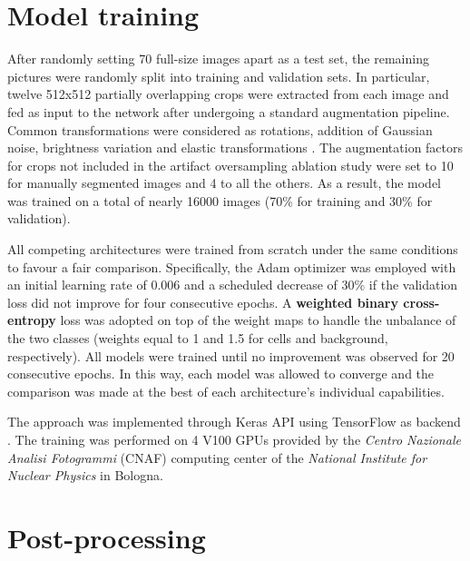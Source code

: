 
\section{Model training}
\label{sec:model_training}
After randomly setting 70 full-size images apart as a test set, the remaining pictures were randomly split into training and validation sets. 
In particular, twelve 512x512 partially overlapping crops were extracted from each image and fed as input to the network after undergoing a standard augmentation pipeline. Common transformations were considered as rotations, addition of Gaussian noise, brightness variation and elastic transformations \cite{elastic_tranformation}. 
The augmentation factors for crops not included in the artifact oversampling ablation study were set to 10 for manually segmented images and 4 to all the others.
As a result, the model was trained on a total of nearly 16000 images (70\% for training and 30\% for validation).

All competing architectures were trained from scratch under the same conditions to favour a fair comparison.
Specifically, the Adam \cite{adam} optimizer was employed with an initial learning rate of 0.006 and a scheduled decrease of 30\% if the validation loss did not improve for four consecutive epochs. 
A \textbf{weighted binary cross-entropy} loss was adopted on top of the weight maps to handle the unbalance of the two classes (weights equal to 1 and 1.5 for cells and background, respectively).
All models were trained until no improvement was observed for 20 consecutive epochs. In this way, each model was allowed to converge and the comparison was made at the best of each architecture's individual capabilities.

The approach was implemented through Keras API \cite{keras} using TensorFlow \cite{tensorflow} as backend
.
The training was performed on 4 V100 GPUs provided by the \textit{Centro Nazionale Analisi Fotogrammi} (CNAF) computing center of the \textit{National Institute for Nuclear Physics} in Bologna.


\section{Post-processing} \label{sec:post_processing}

